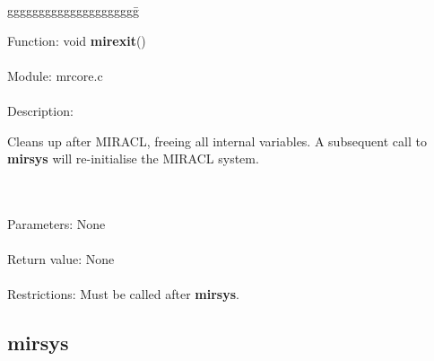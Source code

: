 \begin{tabbing}
ggggggggggggggggggggg\= \kill

      Function:      \> void {\bf mirexit}() \\
      \ \\
      Module:        \>mrcore.c \\
      \ \\
      Description:   \>
                     \parbox[t]{3 in}
                     {Cleans up after MIRACL, freeing all internal variables. 
                     A subsequent call to {\bf mirsys} will re-initialise the
                     MIRACL system.} \\
      \ \\
      Parameters:    \>None \\
      \ \\
      Return value:  \>None \\
      \ \\
      Restrictions:  \>Must be called after {\bf mirsys}.

\end{tabbing}
\pagebreak

\subsection{mirsys}

